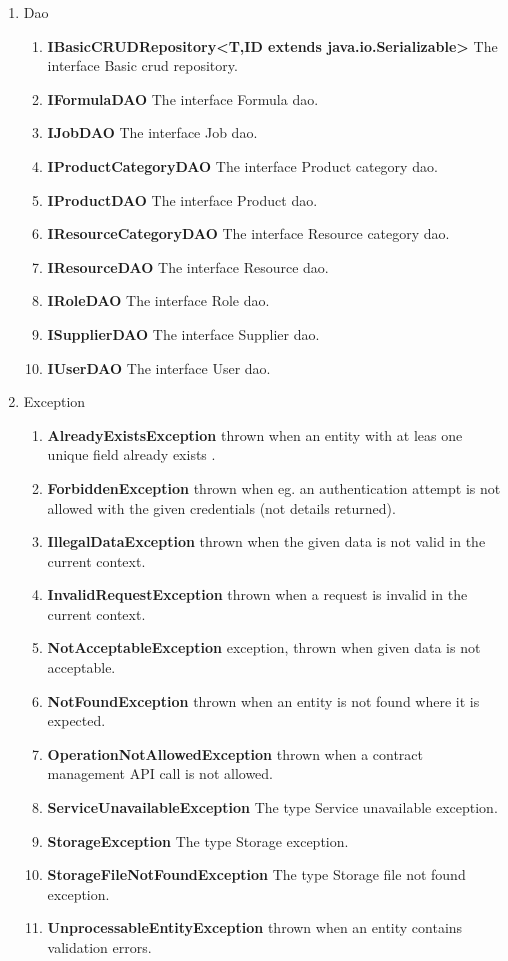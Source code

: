 \documentclass[a4paper,11pt,twoside]{report}
\theoremstyle{definition}
\begin{document}
\begin{enumerate}
\begin{enumerate}
\end{enumerate} 
\item Dao	 
\begin{enumerate} 
\item \textbf{IBasicCRUDRepository<T,ID extends java.io.Serializable>} The interface Basic crud repository.
\item \textbf{IFormulaDAO} The interface Formula dao.
\item \textbf{IJobDAO} The interface Job dao.
\item \textbf{IProductCategoryDAO} The interface Product category dao.
\item \textbf{IProductDAO} The interface Product dao.
\item \textbf{IResourceCategoryDAO} The interface Resource category dao.
\item \textbf{IResourceDAO} The interface Resource dao.
\item \textbf{IRoleDAO} The interface Role dao.
\item \textbf{ISupplierDAO} The interface Supplier dao.
\item \textbf{IUserDAO} The interface User dao.

\end{enumerate} 
\item Exception	 
\begin{enumerate} 
\item \textbf{AlreadyExistsException} thrown when an entity with at leas one unique field already exists .
\item \textbf{ForbiddenException} thrown when eg. an authentication attempt is not allowed with the given credentials (not details returned).
\item \textbf{IllegalDataException} thrown when the given data is not valid in the current context.
\item \textbf{InvalidRequestException} thrown when a request is invalid in the current context.
\item \textbf{NotAcceptableException} exception, thrown when given data is not acceptable.
\item \textbf{NotFoundException} thrown when an entity is not found where it is expected.
\item \textbf{OperationNotAllowedException} thrown when a contract management API call is not allowed.
\item \textbf{ServiceUnavailableException} The type Service unavailable exception.
\item \textbf{StorageException} The type Storage exception.
\item \textbf{StorageFileNotFoundException} The type Storage file not found exception.
\item \textbf{UnprocessableEntityException} thrown when an entity contains validation errors.


\end{enumerate}
\end{enumerate}
\end{document}
